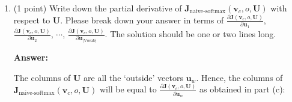 \documentclass{article}
\newenvironment{answer}{
    {\bf Answer:} \sf \begingroup\color{red}
}{\endgroup}%
\begin{document}
\begin{enumerate}[label=(\alph*)]
\begin{shaded}
\begin{answer}
\color{red}
When $w = o \;$:

\begin{equation*} 
\begin{split}
\frac{\partial}{\partial \bm u_w} \bm J_{\text{naive-softmax}}(\bm v_c, o, \bm U) & = - \frac{\partial}{\partial \bm u_o} \text{log exp} (\bm u_o^T \bm v_c) + \frac{\partial}{\partial \bm u_o} \text{log} \sum_{k \in \text{Vocab}} \text{exp} (\bm  u_k^T \bm v_c)\\
 & \boxed{ \frac{\partial}{\partial \bm u_w} \text{log exp} (\bm z) =  \frac{\partial}{\partial \bm u_w} (\bm z)} \; \boxed{ \frac{\partial}{\partial \bm u_w} \text{log} \;\bm z = \frac{1}{\bm z} \cdot \frac{\partial}{\partial \bm u_w} \bm z , \;\; where \; \bm z = f(\bm u_w)}\\
 & = - \frac{\partial}{\partial \bm u_o} (\bm u_o^T \bm v_c) + \frac{1}{\sum_{k \in \text{Vocab}} \text{exp} (\bm  u_k^T \bm v_c)} \cdot \frac{\partial}{\partial \bm u_o} \sum_{\substack{x \in \text{Vocab} \\ x = o}} \text{exp} (\bm  u_x^T \bm v_c)\\
 & = - \bm v_c + \frac{\text{exp} (\bm  u_o^T \bm v_c)}{\sum_{k \in \text{Vocab}} \text{exp} (\bm  u_k^T \bm v_c)} \cdot \bm v_c\\
 & = - \bm v_c + \bm \hat{\bm y}_o \cdot \bm v_c\\
 & = \boxed{(\bm \hat{\bm y}_{w=o} - 1) \cdot \bm v_c}
\end{split}
\end{equation*}

\end{answer}
\end{shaded}

\item (1 point) Write down the partial derivative of $\bm J_{\text{naive-softmax}}(\bm v_c, o, \bm U)$ with respect to $\bm U$. Please break down your answer in terms of $\frac{\partial \bm J(\bm v_c, o, \bm U)}{\partial \bm u_1}$, $\frac{\partial \bm J(\bm v_c, o, \bm U)}{\partial \bm u_2}$, $\cdots$, $\frac{\partial \bm J(\bm v_c, o, \bm U)}{\partial \bm u_{|\text{Vocab}|}}$. The solution should be one or two lines long.

\begin{shaded}
\begin{answer}
The columns of $\bm U$ are all the `outside' vectors $\bm u_{w}$. Hence, the columns of $\bm J_{\text{naive-softmax}}(\bm v_c, o, \bm U)$ will be equal to $\frac{\partial \bm J(\bm v_c,o,\bm U)}{\partial \bm u_w}$ as obtained in part (c):


\end{answer}
\end{shaded}
\end{enumerate}
\end{document}

